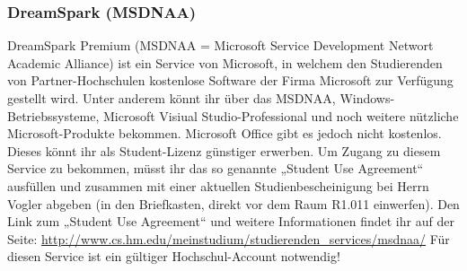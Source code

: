 \subsubsection{DreamSpark (MSDNAA)}
DreamSpark Premium (MSDNAA = Microsoft Service Development 
Networt Academic Alliance) ist ein Service von Microsoft, in welchem 
den Studierenden von Partner-Hochschulen kostenlose Software der 
Firma Microsoft zur Verfügung gestellt wird. \doublebreak
Unter anderem könnt ihr über das MSDNAA, Windows-Betriebssysteme, 
Microsoft Visiual Studio-Professional und noch weitere nützliche 
Microsoft-Produkte bekommen. Microsoft Office gibt es jedoch nicht 
kostenlos. Dieses könnt ihr als Student-Lizenz günstiger erwerben. \doublebreak
Um Zugang zu diesem Service zu bekommen, müsst ihr das so genannte 
„Student Use Agreement“ ausfüllen und zusammen mit einer aktuellen 
Studienbescheinigung bei Herrn Vogler abgeben (in den Briefkasten, 
direkt vor dem Raum R1.011 einwerfen). \doublebreak
Den Link zum „Student Use Agreement“ und weitere Informationen 
findet ihr auf der Seite: \doublebreak
\url{http://www.cs.hm.edu/meinstudium/studierenden\_services/msdnaa/}
Für diesen Service ist ein gültiger Hochschul-Account notwendig!